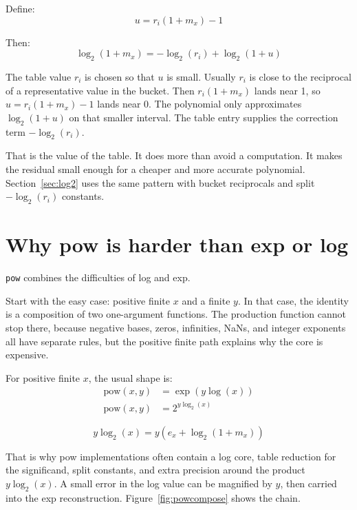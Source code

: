 \documentclass[manuscript, nonacm]{acmart}
\begin{document}
    Define:
    \[ u = r_i(1 + m_x) - 1 \]

    Then:
    \[ \log_2(1 + m_x) = -\log_2(r_i) + \log_2(1 + u) \]

    The table value $r_i$ is chosen so that $u$ is small. Usually $r_i$ is close
    to the reciprocal of a representative value in the bucket. Then
    $r_i(1 + m_x)$ lands near 1, so $u = r_i(1 + m_x) - 1$ lands near 0. The
    polynomial only approximates $\log_2(1 + u)$ on that smaller interval. The
    table entry supplies the correction term $-\log_2(r_i)$.

    That is the value of the table. It does more than avoid a computation. It
    makes the residual small enough for a cheaper and more accurate polynomial.
    Section~\ref{sec:log2} uses the same pattern with bucket reciprocals and
    split $-\log_2(r_i)$ constants.



    \section{Why pow is harder than exp or log}

    \texttt{pow} combines the difficulties of log and exp.

    Start with the easy case: positive finite $x$ and a finite $y$. In that case,
    the identity is a composition of two one-argument functions. The production
    function cannot stop there, because negative bases, zeros, infinities, NaNs,
    and integer exponents all have separate rules, but the positive finite path
    explains why the core is expensive.

    For positive finite $x$, the usual shape is:
    \begin{align*}
        \mathrm{pow}(x, y) &= \exp(y \log(x)) \\
        \mathrm{pow}(x, y) &= 2^{y \log_2(x)}
    \end{align*}

    \[ y \log_2(x) = y(e_x + \log_2(1 + m_x)) \]

    That is why pow implementations often contain a log core, table reduction for
    the significand, split constants, and extra precision around the product
    $y \log_2(x)$. A small error in the log value can be magnified by $y$, then
    carried into the exp reconstruction. Figure~\ref{fig:powcompose} shows
    the chain.
\end{document}
